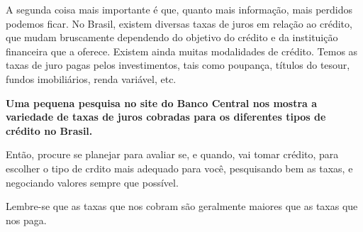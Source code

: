 A segunda coisa mais importante é que, quanto mais informação, mais perdidos podemos ficar. No Brasil, existem diversas taxas de juros em relação ao crédito, que mudam bruscamente dependendo do objetivo do crédito e da instituição financeira que a oferece. Existem ainda muitas modalidades de crédito. Temos as taxas de juro pagas pelos investimentos, tais como poupança, títulos do tesour, fundos imobiliários, renda variável, etc.

\textbf{Uma pequena pesquisa no site do Banco Central nos mostra a variedade de taxas de juros cobradas para os diferentes tipos de crédito no Brasil.}

\begin{figure}[H]
\centering

\end{figure}

Então, procure se planejar para avaliar se, e quando, vai tomar crédito, para escolher o tipo de crdito mais adequado para você, pesquisando bem as taxas, e negociando valores sempre que possível.

Lembre-se que as taxas que nos cobram são geralmente maiores que as taxas que nos paga.

\clearpage

\def\currentcolor{session2}

